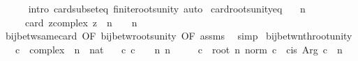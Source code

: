 \begin{isabellebody}
\ \ \ \ \isamarkupfalse%
\ {\isacharparenleft}{\kern0pt}intro\ card{\isacharunderscore}{\kern0pt}subset{\isacharunderscore}{\kern0pt}eq\ finite{\isacharunderscore}{\kern0pt}roots{\isacharunderscore}{\kern0pt}unity{\isacharparenright}{\kern0pt}\ auto\isanewline
{}\isamarkupfalse%
%
\endisatagproof
{\isafoldproof}%
%
\isadelimproof
\isanewline
%
\endisadelimproof
\isanewline
{}\isamarkupfalse%
\ card{\isacharunderscore}{\kern0pt}roots{\isacharunderscore}{\kern0pt}unity{\isacharunderscore}{\kern0pt}eq{\isacharcolon}{\kern0pt}\isanewline
\ \ \ {\isachardoublequoteopen}n\ {\isachargreater}{\kern0pt}\ {}{\isachardoublequoteclose}\isanewline
\ \ \ \ \ {\isachardoublequoteopen}card\ {\isacharbraceleft}{\kern0pt}z{\isacharcolon}{\kern0pt}{\isacharcolon}{\kern0pt}complex{\isachardot}{\kern0pt}\ z\ {\isacharcircum}{\kern0pt}\ n\ {\isacharequal}{\kern0pt}\ {}{\isacharbraceright}{\kern0pt}\ {\isacharequal}{\kern0pt}\ n{\isachardoublequoteclose}\isanewline
%
\isadelimproof
\ \ %
\endisadelimproof
%
\isatagproof
{}\isamarkupfalse%
\ bij{\isacharunderscore}{\kern0pt}betw{\isacharunderscore}{\kern0pt}same{\isacharunderscore}{\kern0pt}card\ {\isacharbrackleft}{\kern0pt}OF\ bij{\isacharunderscore}{\kern0pt}betw{\isacharunderscore}{\kern0pt}roots{\isacharunderscore}{\kern0pt}unity\ {\isacharbrackleft}{\kern0pt}OF\ assms{\isacharbrackright}{\kern0pt}{\isacharbrackright}{\kern0pt}\ \isamarkupfalse%
\ simp%
\endisatagproof
{\isafoldproof}%
%
\isadelimproof
\isanewline
%
\endisadelimproof
\isanewline
{}\isamarkupfalse%
\ bij{\isacharunderscore}{\kern0pt}betw{\isacharunderscore}{\kern0pt}nth{\isacharunderscore}{\kern0pt}root{\isacharunderscore}{\kern0pt}unity{\isacharcolon}{\kern0pt}\isanewline
\ \ \ c\ {\isacharcolon}{\kern0pt}{\isacharcolon}{\kern0pt}\ complex\ \ n\ {\isacharcolon}{\kern0pt}{\isacharcolon}{\kern0pt}\ nat\isanewline
\ \ \ c{\isacharcolon}{\kern0pt}\ {\isachardoublequoteopen}c\ {\isasymnoteq}\ {}{\isachardoublequoteclose}\ \ n{\isacharcolon}{\kern0pt}\ {\isachardoublequoteopen}n\ {\isachargreater}{\kern0pt}\ {}{\isachardoublequoteclose}\isanewline
\ \ \ {\isachardoublequoteopen}c{\isacharprime}{\kern0pt}\ {\isasymequiv}\ root\ n\ {\isacharparenleft}{\kern0pt}norm\ c{\isacharparenright}{\kern0pt}\ {\isacharasterisk}{\kern0pt}\ cis\ {\isacharparenleft}{\kern0pt}Arg\ c\ {\isacharslash}{\kern0pt}\ n{\isacharparenright}{\kern0pt}{\isachardoublequoteclose}\isanewline

\end{isabellebody}
